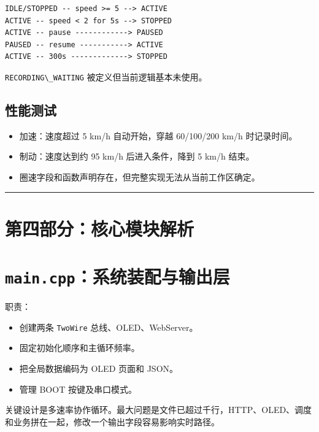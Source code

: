 \documentclass[
  UTF8,11pt,a4paper]{ctexart}
\newcommand{\passthrough}[1]{#1}
\providecommand{\tightlist}{%
  \setlength{\itemsep}{0pt}\setlength{\parskip}{0pt}}
\begin{document}
\begin{lstlisting}
IDLE/STOPPED -- speed >= 5 --> ACTIVE
ACTIVE -- speed < 2 for 5s --> STOPPED
ACTIVE -- pause ------------> PAUSED
PAUSED -- resume -----------> ACTIVE
ACTIVE -- 300s -------------> STOPPED
\end{lstlisting}

\passthrough{\lstinline!RECORDING\_WAITING!}
被定义但当前逻辑基本未使用。

\subsection{性能测试}\label{ux6027ux80fdux6d4bux8bd5}

\begin{itemize}
\tightlist
\item
  加速：速度超过 5 km/h 自动开始，穿越 60/100/200 km/h 时记录时间。
\item
  制动：速度达到约 95 km/h 后进入条件，降到 5 km/h 结束。
\item
  圈速字段和函数声明存在，但完整实现无法从当前工作区确定。
\end{itemize}

\begin{center}\rule{0.5\linewidth}{0.5pt}\end{center}

\section{第四部分：核心模块解析}\label{ux7b2cux56dbux90e8ux5206ux6838ux5fc3ux6a21ux5757ux89e3ux6790}

\section{\texorpdfstring{\texttt{main.cpp}：系统装配与输出层}{main.cpp：系统装配与输出层}}\label{maincppux7cfbux7edfux88c5ux914dux4e0eux8f93ux51faux5c42}

职责：

\begin{itemize}
\tightlist
\item
  创建两条 \passthrough{\lstinline!TwoWire!} 总线、OLED、WebServer。
\item
  固定初始化顺序和主循环频率。
\item
  把全局数据编码为 OLED 页面和 JSON。
\item
  管理 BOOT 按键及串口模式。
\end{itemize}

关键设计是多速率协作循环。最大问题是文件已超过千行，HTTP、OLED、调度和业务拼在一起，修改一个输出字段容易影响实时路径。
\end{document}
